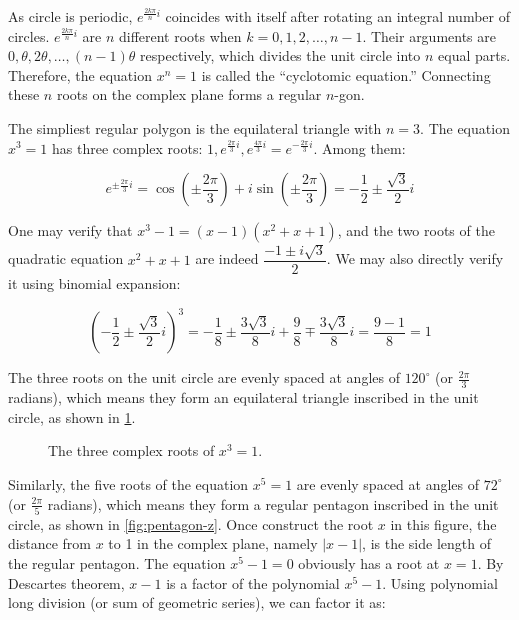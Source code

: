 \documentclass[b5paper]{article}
\begin{document}
As circle is periodic, $e^{\frac{2k\pi}{n}i}$ coincides with itself after rotating an integral number of circles. $e^{\frac{2k\pi}{n}i}$ are $n$ different roots when $k = 0, 1, 2, \dotsc, n-1$. Their arguments are $0, \theta, 2\theta, \dotsc, (n-1)\theta$ respectively, which divides the unit circle into $n$ equal parts. Therefore, the equation $x^n = 1$ is called the \enquote{cyclotomic equation.} Connecting these $n$ roots on the complex plane forms a regular $n$-gon.

The simpliest regular polygon is the equilateral triangle with $n = 3$. The equation $x^3 = 1$ has three complex roots: $1, e^{\frac{2\pi}{3}i}, e^{\frac{4\pi}{3}i} = e^{-\frac{2\pi}{3}i}$. Among them:

\[
e^{\pm \frac{2\pi}{3}i} = \cos (\pm \frac{2\pi}{3}) + i \sin (\pm \frac{2\pi}{3}) = -\frac{1}{2} \pm \frac{\sqrt{3}}{2}i
\]

One may verify that $x^3 - 1 = (x - 1)(x^2 + x + 1)$, and the two roots of the quadratic equation $x^2 + x + 1$ are indeed $\dfrac{-1 \pm i\sqrt{3}}{2}$. We may also directly verify it using binomial expansion:

\[
\left(-\frac{1}{2} \pm \frac{\sqrt{3}}{2}i\right)^3 = -\frac{1}{8} \pm \frac{3\sqrt{3}}{8}i + \frac{9}{8} \mp \frac{3\sqrt{3}}{8}i = \frac{9-1}{8} = 1
\]

The three roots on the unit circle are evenly spaced at angles of $120^\circ$ (or $\frac{2\pi}{3}$ radians), which means they form an equilateral triangle inscribed in the unit circle, as shown in \cref{fig:3rd-root-of-1}.

\begin{figure}[htbp]
\centering
{}
\caption{The three complex roots of $x^3 = 1$.}
\label{fig:3rd-root-of-1}
\end{figure}

Similarly, the five roots of the equation $x^5 = 1$ are evenly spaced at angles of $72^\circ$ (or $\frac{2\pi}{5}$ radians), which means they form a regular pentagon inscribed in the unit circle, as shown in \cref{fig:pentagon-z}. Once construct the root $x$ in this figure, the distance from $x$ to 1 in the complex plane, namely $|x - 1|$, is the side length of the regular pentagon. The equation $x^5 - 1 = 0$ obviously has a root at $x = 1$. By Descartes  theorem, $x - 1$ is a factor of the polynomial $x^5 - 1$. Using polynomial long division (or sum of geometric series), we can factor it as:
\end{document}
